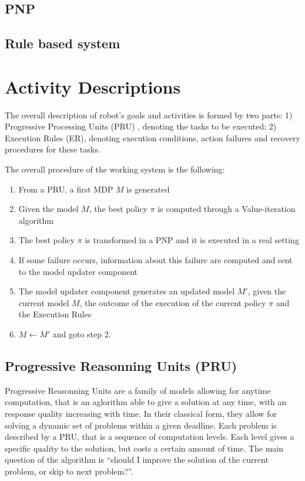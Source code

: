 \subsection{PNP}

\subsection{Rule based system}

\section{Activity Descriptions}

The overall description of robot's goals and activities is formed by two parts:
1) Progressive Processing Units (PRU) \cite{CaMoZi01}, denoting the tasks to be executed;
2) Execution Rules (ER), denoting execution conditions, action failures and recovery procedures for these tasks.

The overall procedure of the working system is the following:
\begin{enumerate}
\item From a PRU, a first MDP $M$ is generated 
\item Given the model $M$, the best policy $\pi$ is computed through a Value-iteration algorithm
\item The best policy $\pi$ is transformed in a PNP and it is executed in a real setting
\item If some failure occurs, information about this failure are computed and sent to the model updater component
\item The model updater component generates an updated model $M'$, given the current model $M$, the outcome of the execution of the current policy $\pi$ and the Execution Rules
\item $M \leftarrow M'$ and goto step 2. 
\end{enumerate}



\subsection{Progressive Reasonning Units (PRU)}

Progressive Reasonning Units \cite{MZDecai98ws} are a family of models allowing for anytime computation, that is an aglorithm able to give a solution at any time, with an response quality increasing with time. In their classical form, they allow for solving a dynamic set of problems within a given deadline.
Each problem is described by a PRU, that is a sequence of computation levels. Each level gives a specific quality to the solution, but costs a certain amount of time. The main question of the algorithm is ``should I improve the solution of the current problem, or skip to next problem?''.

